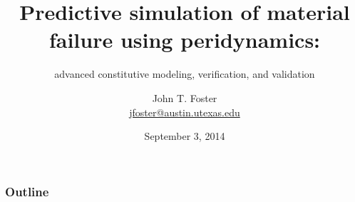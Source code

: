 \documentclass[t,serif]{beamer}
\title{Predictive simulation of material failure using peridynamics:}
\subtitle{advanced constitutive modeling, verification, and validation}
\author{John T. Foster \\ \href{mailto:jfoster@austin.utexas.edu}{jfoster@austin.utexas.edu}}
\institute{The University of Texas at Austin}
\date{September 3, 2014}
\begin{document}
\begin{frame}
\titlepage
\note{ }
\end{frame}

\begin{frame}
\frametitle{Outline}
\tableofcontents[hideallsubsections]
\note{ }
\end{frame}


\end{document}
